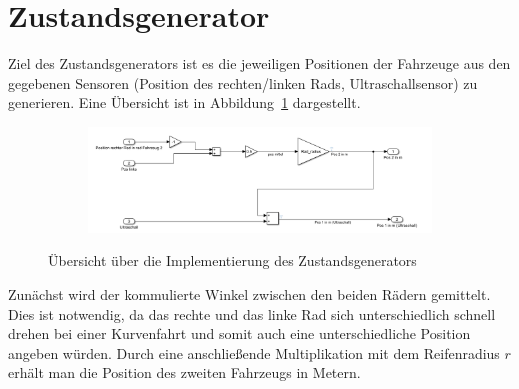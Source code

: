 \section{Zustandsgenerator}\label{sec:zustandsgenerator}
Ziel des Zustandsgenerators ist es die jeweiligen Positionen der Fahrzeuge aus
den gegebenen Sensoren (Position des rechten/linken Rads, Ultraschallsensor) zu
generieren. Eine Übersicht ist in Abbildung~\ref{fig:zustandsgenerator}
dargestellt.
\begin{figure}[hbt]
\centering
\begin{subfigure}{0.79\textwidth}
    \centering
    \includegraphics*[width=\textwidth]{figures/zustandsgenerator.png}
\end{subfigure}
    \caption{Übersicht über die Implementierung des Zustandsgenerators
    \label{fig:zustandsgenerator}}
\end{figure}    
Zunächst wird der kommulierte Winkel zwischen den beiden Rädern gemittelt. Dies
ist notwendig, da das rechte und das linke Rad sich unterschiedlich schnell
drehen bei einer Kurvenfahrt und somit auch eine unterschiedliche Position
angeben würden. Durch eine anschließende Multiplikation mit dem Reifenradius $r$
erhält man die Position des zweiten Fahrzeugs in Metern.

